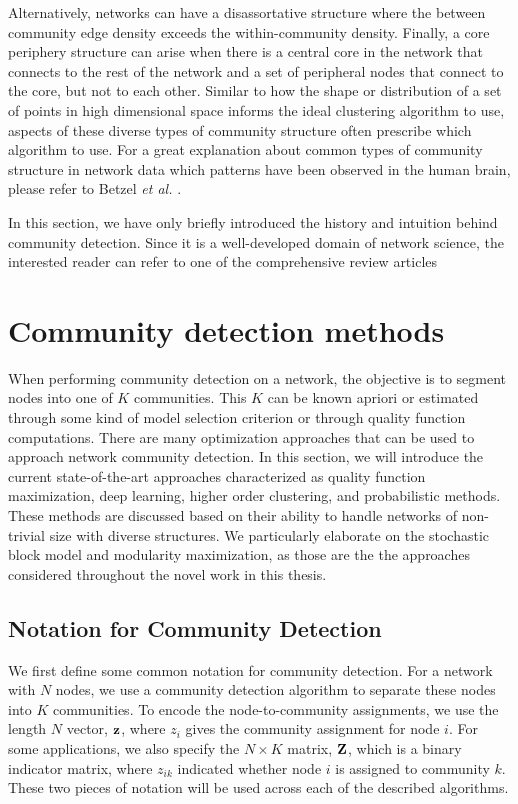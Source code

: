 Alternatively, networks can have a disassortative structure where the between community edge density exceeds the within-community density. Finally, a core periphery structure can arise when there is a central core in the network that connects to the rest of the network and a set of peripheral nodes that connect to the core, but not to each other.  Similar to how the shape or distribution of a set of points in high dimensional space informs the ideal clustering algorithm to use, aspects of these diverse types of community structure often prescribe which algorithm to use. For a great explanation about common types of community structure in network data which patterns have been observed in the human brain, please refer to Betzel \emph{et al.} \cite{betzel}.  

In this section, we have only briefly introduced the history and intuition behind community detection. Since it is a well-developed domain of network science, the interested reader can refer to one of the comprehensive review articles \cite{fortu1,fortu2,shaicase,muchacommunity}

\section{Community detection methods}
When performing community detection on a network, the objective is to segment nodes into one of $K$ communities. This $K$ can be known apriori or estimated through some kind of model selection criterion or through quality function computations. There are many optimization approaches that can be used to approach network community detection. In this section, we will introduce the current state-of-the-art approaches characterized as quality function maximization, deep learning, higher order clustering, and probabilistic methods. These methods are discussed based on their ability to handle networks of non-trivial size with diverse structures. We particularly elaborate on the stochastic block model and modularity maximization, as those are the the approaches considered throughout the novel work in this thesis.  

\subsection{Notation for Community Detection}
We first define some common notation for community detection. For a network with $N$ nodes, we use a community detection algorithm to separate these nodes into $K$ communities. To encode the node-to-community assignments, we use the length $N$ vector, ${\bf z}$, where $z_{i}$ gives the community assignment for node $i$. For some applications, we also specify the $N \times K$ matrix, ${\bf Z}$, which is a binary indicator matrix, where $z_{ik}$ indicated whether node $i$ is assigned to community $k$. These two pieces of notation will be used across each of the described algorithms. 

